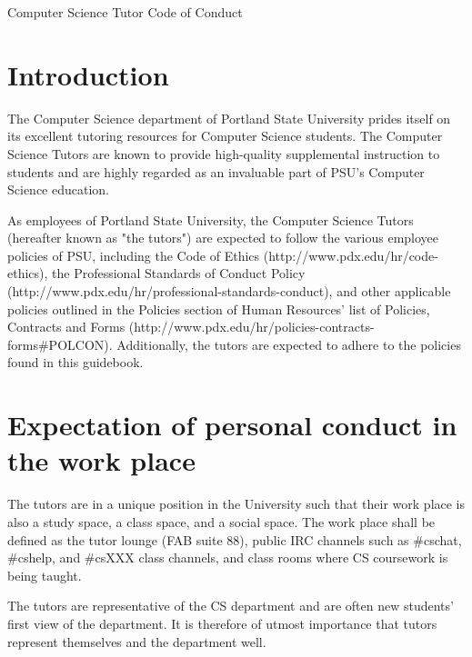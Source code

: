 \documentclass[12pt]{article}
\renewcommand{\maketitle}[1]{%
  \begin{center}%
    {\huge%
    {\sffamily%
      #1
    }}%
    \vspace{2em}
  \end{center}
}
\begin{document}

\maketitle{Computer Science Tutor Code of Conduct}

\section{Introduction}
The Computer Science department of Portland State University prides 
itself on its excellent tutoring resources for Computer Science 
students. The Computer Science Tutors are known to provide high-quality 
supplemental instruction to students and are highly regarded 
as an invaluable part of PSU's Computer Science education.

As employees of Portland State University, the Computer Science 
Tutors (hereafter known as "the tutors") are expected to follow the
various employee policies of PSU, including the Code of Ethics 
(http://www.pdx.edu/hr/code-ethics), the Professional Standards of 
Conduct \linebreak Policy 
(http://www.pdx.edu/hr/professional-standards-conduct),
and other applicable policies outlined in the Policies section of 
Human Resources' list of Policies, Contracts and Forms \linebreak
(http://www.pdx.edu/hr/policies-contracts-forms\#POLCON). 
Additionally, the tutors are expected to adhere to the policies found 
in this guidebook.

\section{Expectation of personal conduct in the work place}
The tutors are in a unique position in the University such that their work 
place is also a study space, a class space, and a social space. The work 
place shall be defined as the tutor lounge (FAB suite 88),
public IRC channels such as \#cschat, \#cshelp, and \#csXXX class 
channels, and class rooms where CS coursework is being taught. 

The tutors are representative of the CS department and are often new 
students' first view of the department. It is therefore of utmost 
importance that tutors represent themselves and the department well. 
\end{document}
